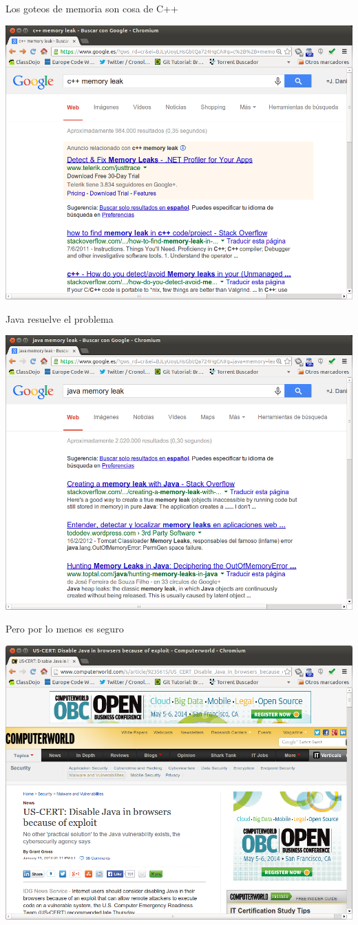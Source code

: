 \begin{frame}[t]{Los goteos de memoria son cosa de C++}
\begin{center}
\includegraphics[width=.7\textwidth]{images/cpp-leak.png}
\end{center}
\end{frame}

\begin{frame}[t]{Java resuelve el problema}
\begin{center}
\includegraphics[width=.7\textwidth]{images/java-leak.png}
\end{center}
\end{frame}

\begin{frame}[t]{Pero por lo menos es seguro}
\begin{center}
\includegraphics[width=.7\textwidth]{images/java-cert.png}
\end{center}
\end{frame}

